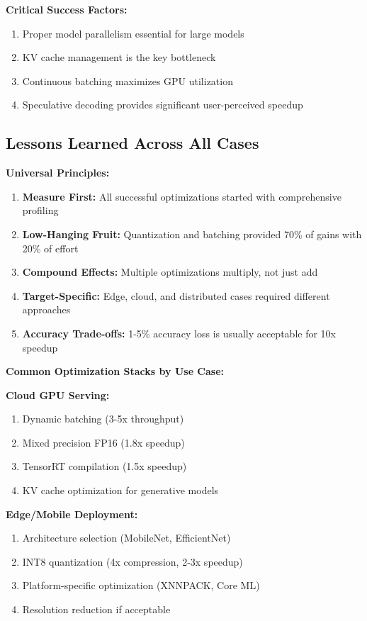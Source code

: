 \textbf{Critical Success Factors:}
\begin{enumerate}
    \item Proper model parallelism essential for large models
    \item KV cache management is the key bottleneck
    \item Continuous batching maximizes GPU utilization
    \item Speculative decoding provides significant user-perceived speedup
\end{enumerate}

\subsection{Lessons Learned Across All Cases}

\textbf{Universal Principles:}

\begin{enumerate}
    \item \textbf{Measure First:} All successful optimizations started with comprehensive profiling
    \item \textbf{Low-Hanging Fruit:} Quantization and batching provided 70\% of gains with 20\% of effort
    \item \textbf{Compound Effects:} Multiple optimizations multiply, not just add
    \item \textbf{Target-Specific:} Edge, cloud, and distributed cases required different approaches
    \item \textbf{Accuracy Trade-offs:} 1-5\% accuracy loss is usually acceptable for 10x speedup
\end{enumerate}

\textbf{Common Optimization Stacks by Use Case:}

\textbf{Cloud GPU Serving:}
\begin{enumerate}
    \item Dynamic batching (3-5x throughput)
    \item Mixed precision FP16 (1.8x speedup)
    \item TensorRT compilation (1.5x speedup)
    \item KV cache optimization for generative models
\end{enumerate}

\textbf{Edge/Mobile Deployment:}
\begin{enumerate}
    \item Architecture selection (MobileNet, EfficientNet)
    \item INT8 quantization (4x compression, 2-3x speedup)
    \item Platform-specific optimization (XNNPACK, Core ML)
    \item Resolution reduction if acceptable
\end{enumerate}

